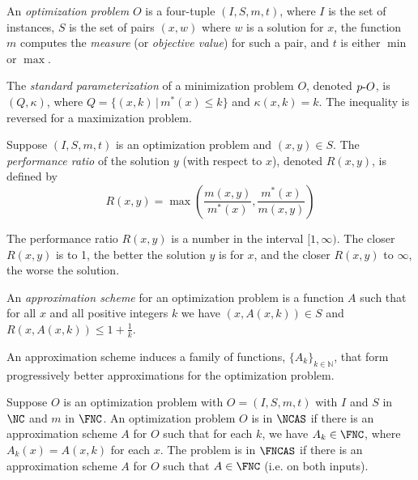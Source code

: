 \documentclass{article}
\newcommand{\dash}{\textnormal{-}}
\begin{document}
\begin{definition}
  An \emph{optimization problem} $O$ is a four-tuple $(I, S, m, t)$, where $I$ is the set of instances, $S$ is the set of pairs $(x, w)$ where $w$ is a solution for $x$, the function $m$ computes the \emph{measure} (or \emph{objective value}) for such a pair, and $t$ is either $\min$ or $\max$.
\end{definition}

\begin{definition}\label{def:standard}
  The \emph{standard parameterization} of a minimization problem $O$, denoted $p\dash{O}$, is $(Q, \kappa)$, where $Q = \{ (x, k) \, | \, m^*(x) \leq k \}$ and $\kappa(x, k) = k$.
  The inequality is reversed for a maximization problem.
\end{definition}

\begin{definition}
  Suppose $(I, S, m, t)$ is an optimization problem and $(x, y) \in S$.
  The \emph{performance ratio} of the solution $y$ (with respect to $x$), denoted $R(x, y)$, is defined by
  \[
  R(x, y) = \max \left(\frac{m(x, y)}{m^*(x)}, \frac{m^*(x)}{m(x, y)}\right)
  \]
\end{definition}

The performance ratio $R(x, y)$ is a number in the interval $[1, \infty)$.
The closer $R(x, y)$ is to 1, the better the solution $y$ is for $x$, and the closer $R(x, y)$ to $\infty$, the worse the solution.

\begin{definition}
  An \emph{approximation scheme} for an optimization problem is a function $A$ such that for all $x$ and all positive integers $k$ we have $(x, A(x, k)) \in S$ and $R(x, A(x, k)) \leq 1 + \frac{1}{k}$.
\end{definition}

An approximation scheme induces a family of functions, $\{A_k\}_{k \in \mathbb{N}}$, that form progressively better approximations for the optimization problem.


\begin{definition}
  Suppose $O$ is an optimization problem with $O = (I, S, m, t)$ with $I$ and $S$ in $\NC$ and $m$ in $\FNC$.
  An optimization problem $O$ is in $\NCAS$ if there is an approximation scheme $A$ for $O$ such that for each $k$, we have $A_k \in \FNC$, where $A_k(x) = A(x, k)$ for each $x$.
  The problem is in $\FNCAS$ if there is an approximation scheme $A$ for $O$ such that $A \in \FNC$ (i.e. on both inputs).
\end{definition}
\end{document}
